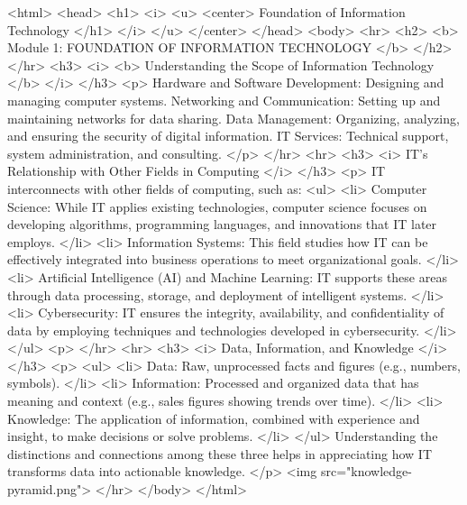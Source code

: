 <html>
  <head> <h1> <i> <u> <center> Foundation of Information Technology </h1> </i> </u> </center> </head>
<body>
<hr>
  <h2> <b> Module 1: FOUNDATION OF INFORMATION TECHNOLOGY </b> </h2>
</hr> 
  <h3> <i> <b> Understanding the Scope of Information Technology </b> </i> </h3> 
<p> Hardware and Software Development: Designing and managing computer systems.
Networking and Communication: Setting up and maintaining networks for data sharing.
Data Management: Organizing, analyzing, and ensuring the security of digital information.
IT Services: Technical support, system administration, and consulting. </p>
</hr>
<hr>
  <h3> <i> IT's Relationship with Other Fields in Computing </i> </h3>
  <p> IT interconnects with other fields of computing, such as:
  <ul>
    <li>  Computer Science: While IT applies existing technologies, computer science focuses on developing algorithms, programming languages, and innovations that IT later employs. </li>
    <li> Information Systems: This field studies how IT can be effectively integrated into business operations to meet organizational goals. </li>
    <li> Artificial Intelligence (AI) and Machine Learning: IT supports these areas through data processing, storage, and deployment of intelligent systems. </li>
    <li> Cybersecurity: IT ensures the integrity, availability, and confidentiality of data by employing techniques and technologies developed in cybersecurity. </li> 
  </ul>	
  <p>
</hr>
<hr>
  <h3> <i> Data, Information, and Knowledge </i> </h3> 
  <p> <ul>
    <li> Data: Raw, unprocessed facts and figures (e.g., numbers, symbols). </li>
    <li> Information: Processed and organized data that has meaning and context (e.g., sales figures showing trends over time). </li>
    <li> Knowledge: The application of information, combined with experience and insight, to make decisions or solve problems. </li>
	</ul>  
Understanding the distinctions and connections among these three helps in appreciating how IT transforms data into actionable knowledge. </p>
<img src="knowledge-pyramid.png">
</hr>
</body>
</html>
 
  

